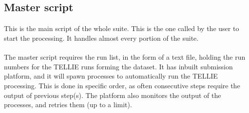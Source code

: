 \documentclass[12pt]{article}
\begin{document}
\clearpage

\subsection{Master script}\label{sub:master}
\paragraph{}
This is the main script of the whole suite. This is the one called by the user to start the processing. It handles almost every portion of the suite.

\paragraph{}
The master script requires the run list, in the form of a text file, holding the run numbers for the TELLIE runs forming the dataset. It has inbuilt submission platform, and it will spawn processes to automatically run the TELLIE processing. This is done in specific order, as often consecutive steps require the output of previous step(s). The platform also monitors the output of the processes, and retries them (up to a limit).
\end{document}
